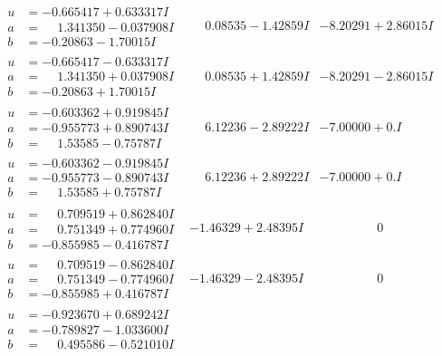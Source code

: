 \documentclass[1p]{elsarticle_modified}
\theoremstyle{definition}
\begin{document}
$$\begin{array}{c|c|c}
\begin{aligned}
u &= -0.665417 + 0.633317 I \\
a &= \phantom{-}1.341350 - 0.037908 I \\
b &= -0.20863 - 1.70015 I\end{aligned}
 & \phantom{-}0.08535 - 1.42859 I & -8.20291 + 2.86015 I \\ \hline\begin{aligned}
u &= -0.665417 - 0.633317 I \\
a &= \phantom{-}1.341350 + 0.037908 I \\
b &= -0.20863 + 1.70015 I\end{aligned}
 & \phantom{-}0.08535 + 1.42859 I & -8.20291 - 2.86015 I \\ \hline\begin{aligned}
u &= -0.603362 + 0.919845 I \\
a &= -0.955773 + 0.890743 I \\
b &= \phantom{-}1.53585 - 0.75787 I\end{aligned}
 & \phantom{-}6.12236 - 2.89222 I & -7.00000 + 0. I\phantom{ +0.000000I} \\ \hline\begin{aligned}
u &= -0.603362 - 0.919845 I \\
a &= -0.955773 - 0.890743 I \\
b &= \phantom{-}1.53585 + 0.75787 I\end{aligned}
 & \phantom{-}6.12236 + 2.89222 I & -7.00000 + 0. I\phantom{ +0.000000I} \\ \hline\begin{aligned}
u &= \phantom{-}0.709519 + 0.862840 I \\
a &= \phantom{-}0.751349 + 0.774960 I \\
b &= -0.855985 - 0.416787 I\end{aligned}
 & -1.46329 + 2.48395 I & \phantom{-0.000000 } 0 \\ \hline\begin{aligned}
u &= \phantom{-}0.709519 - 0.862840 I \\
a &= \phantom{-}0.751349 - 0.774960 I \\
b &= -0.855985 + 0.416787 I\end{aligned}
 & -1.46329 - 2.48395 I & \phantom{-0.000000 } 0 \\ \hline\begin{aligned}
u &= -0.923670 + 0.689242 I \\
a &= -0.789827 - 1.033600 I \\
b &= \phantom{-}0.495586 - 0.521010 I\end{aligned}

\end{array}$$
\end{document}
